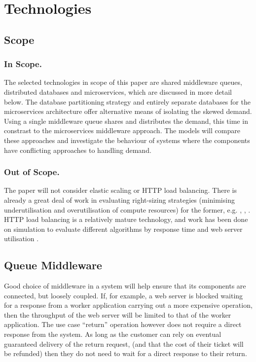 %
%

\section{Technologies}\label{sec:technologies}

%
%
\subsection{Scope}
\subsubsection{In Scope.}  The selected technologies in scope of this paper are shared middleware queues, distributed databases and microservices, which are discussed in more detail below.  The database partitioning strategy and entirely separate databases for the microservices architecture offer alternative means of isolating the skewed demand.  Using a single middleware queue shares and distributes the demand, this time in constrast to the microservices middleware approach.  The models will compare these approaches and investigate the behaviour of systems where the components have conflicting approaches to handling demand.
\subsubsection{Out of Scope.}  The paper will not consider elastic scaling or HTTP load balancing.  There is already a great deal of work in evaluating right-sizing strategies (minimising underutilisation and overutilisation of compute resources) for the former, e.g. \cite{RN49}, \cite{RN62}, \cite{RN48}.  HTTP load balancing is a relatively mature technology, and work has been done on simulation to evaluate different algorithms by response time and web server utilisation \cite{RN55}.

%
%

\subsection{Queue Middleware}\label{sec:middleware}

Good choice of middleware in a system will help ensure that its components are connected, but loosely coupled.  If, for example, a web server is blocked waiting for a response from a worker application carrying out a more expensive operation, then the throughput of the web server will be limited to that of the worker application.  The use case ``return'' operation however does not require a direct response from the system.  As long as the customer can rely on eventual guaranteed delivery of the return request, (and that the cost of their ticket will be refunded) then they do not need to wait for a direct response to their return.

